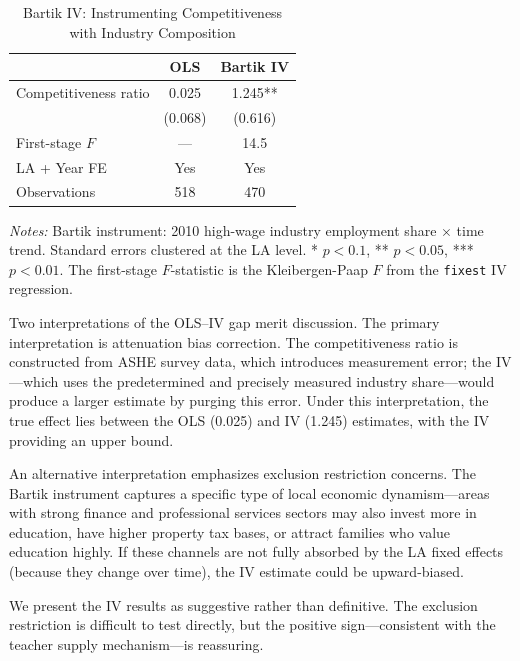 \documentclass[12pt]{article}
\begin{document}
\begin{table}[H]
\centering
\caption{Bartik IV: Instrumenting Competitiveness with Industry Composition}
\label{tab:iv}
\begin{threeparttable}
\begin{tabular}{lcc}
\toprule
 & OLS & Bartik IV \\
\midrule
Competitiveness ratio & 0.025 & 1.245** \\
 & (0.068) & (0.616) \\
\midrule
First-stage $F$ & --- & 14.5 \\
LA + Year FE & Yes & Yes \\
Observations & 518 & 470 \\
\bottomrule
\end{tabular}
\begin{tablenotes}[flushleft]
\small
\item \textit{Notes:} Bartik instrument: 2010 high-wage industry employment share $\times$ time trend. Standard errors clustered at the LA level. * $p<0.1$, ** $p<0.05$, *** $p<0.01$. The first-stage $F$-statistic is the Kleibergen-Paap $F$ from the \texttt{fixest} IV regression.
\end{tablenotes}
\end{threeparttable}
\end{table}

Two interpretations of the OLS--IV gap merit discussion. The primary interpretation is attenuation bias correction. The competitiveness ratio is constructed from ASHE survey data, which introduces measurement error; the IV---which uses the predetermined and precisely measured industry share---would produce a larger estimate by purging this error. Under this interpretation, the true effect lies between the OLS (0.025) and IV (1.245) estimates, with the IV providing an upper bound.

An alternative interpretation emphasizes exclusion restriction concerns. The Bartik instrument captures a specific type of local economic dynamism---areas with strong finance and professional services sectors may also invest more in education, have higher property tax bases, or attract families who value education highly. If these channels are not fully absorbed by the LA fixed effects (because they change over time), the IV estimate could be upward-biased.

We present the IV results as suggestive rather than definitive. The exclusion restriction is difficult to test directly, but the positive sign---consistent with the teacher supply mechanism---is reassuring.
\end{document}
